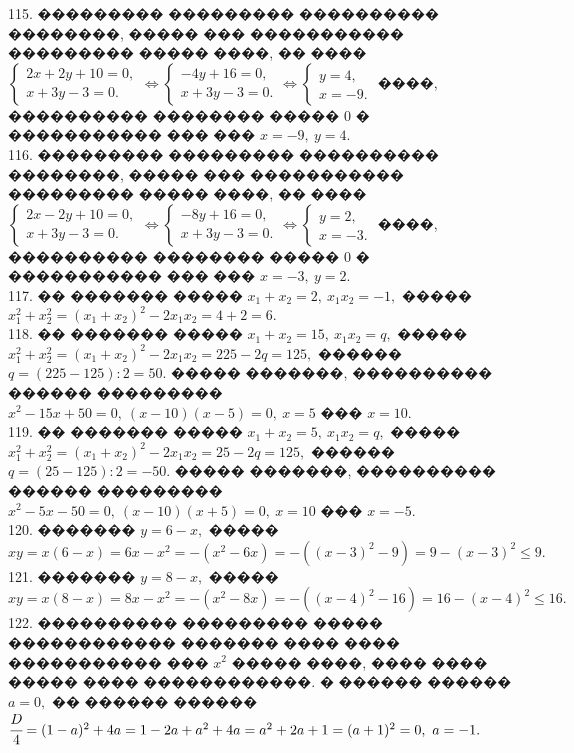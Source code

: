 \documentclass[12pt]{article}
\begin{document}
115. ��������� ��������� ���������� ��������, ����� ��� ����������� ��������� ����� ����, �� ���� $\begin{cases} 2x+2y+10=0,\\ x+3y-3=0.\end{cases}
\Leftrightarrow \begin{cases} -4y+16=0,\\ x+3y-3=0.\end{cases}\Leftrightarrow \begin{cases} y=4,\\ x=-9.\end{cases}$ ����, ���������� �������� ����� 0 � ����������� ��� ��� $x=-9,\ y=4.$\\
116. ��������� ��������� ���������� ��������, ����� ��� ����������� ��������� ����� ����, �� ���� $\begin{cases} 2x-2y+10=0,\\ x+3y-3=0.\end{cases}
\Leftrightarrow \begin{cases} -8y+16=0,\\ x+3y-3=0.\end{cases}\Leftrightarrow \begin{cases} y=2,\\ x=-3.\end{cases}$ ����, ���������� �������� ����� 0 � ����������� ��� ��� $x=-3,\ y=2.$\\
117. �� ������� ����� $x_1+x_2=2,\ x_1x_2=-1,$ ����� $x_1^2+x_2^2=(x_1+x_2)^2-2x_1x_2=4+2=6.$\\
118. �� ������� ����� $x_1+x_2=15,\ x_1x_2=q,$ ����� $x_1^2+x_2^2=(x_1+x_2)^2-2x_1x_2=225-2q=125,$ ������ $q=(225-125):2=50.$ ����� �������, ���������� ������ ��������� $x^2-15x+50=0,\ (x-10)(x-5)=0,\ x=5$ ��� $x=10.$\\
119. �� ������� ����� $x_1+x_2=5,\ x_1x_2=q,$ ����� $x_1^2+x_2^2=(x_1+x_2)^2-2x_1x_2=25-2q=125,$ ������ $q=(25-125):2=-50.$ ����� �������, ���������� ������ ��������� $x^2-5x-50=0,\ (x-10)(x+5)=0,\ x=10$ ��� $x=-5.$\\
120. ������� $y=6-x,$ ����� $xy=x(6-x)=6x-x^2=-(x^2-6x)=-((x-3)^2-9)=9-(x-3)^2\leqslant 9.$\\
121. ������� $y=8-x,$ ����� $xy=x(8-x)=8x-x^2=-(x^2-8x)=-((x-4)^2-16)=16-(x-4)^2\leqslant 16.$\\
122. ���������� ��������� ����� ������������ ������� ���� ���� ����������� ��� $x^2$ ����� ����, ���� ���� ����� ���� ������������. � ������ ������ $a=0,$ �� ������ ������ $\cfrac{D}{4}=(1-a)^2+4a=1-2a+a^2+4a=a^2+2a+1=(a+1)^2=0,\ a=-1.$\\
\end{document}
